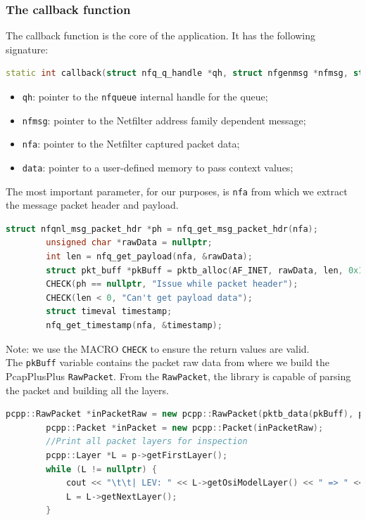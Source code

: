 \documentclass[12pt]{article}
\begin{document}
	\subsubsection{The callback function}

	The callback function is the core of the application. It has the following signature:
	\bigbreak
	
	\begin{lstlisting}[frame=single, language=C++]
		static int callback(struct nfq_q_handle *qh, struct nfgenmsg *nfmsg, struct nfq_data *nfa, void *data);
	\end{lstlisting}
	\bigbreak

	\begin{itemize}
		\item \lstinline{qh}: pointer to the \lstinline{nfqueue} internal handle for the queue;
		\item \lstinline{nfmsg}: pointer to the Netfilter address family dependent message;
		\item \lstinline{nfa}: pointer to the Netfilter captured packet data;
		\item \lstinline{data}: pointer to a user-defined memory to pass context values;
	\end{itemize}
	\bigbreak

	The most important parameter, for our purposes, is \lstinline{nfa} from which we extract the message packet header and payload.\\
	\bigbreak

	\begin{lstlisting}[frame=single, language=C++]
		struct nfqnl_msg_packet_hdr *ph = nfq_get_msg_packet_hdr(nfa);
		unsigned char *rawData = nullptr;
		int len = nfq_get_payload(nfa, &rawData);
		struct pkt_buff *pkBuff = pktb_alloc(AF_INET, rawData, len, 0x1000);
		CHECK(ph == nullptr, "Issue while packet header");
		CHECK(len < 0, "Can't get payload data");
		struct timeval timestamp;
		nfq_get_timestamp(nfa, &timestamp);
	\end{lstlisting}

	Note: we use the MACRO \lstinline{CHECK} to ensure the return values are valid.\\
	\bigbreak
	The \lstinline{pkBuff} variable contains the packet raw data from where we build the PcapPlusPlus \lstinline{RawPacket}. From the \lstinline{RawPacket}, the library is capable of parsing the packet and building all the layers.\\
	\bigbreak

	\begin{lstlisting}[frame=single, language=C++]
		pcpp::RawPacket *inPacketRaw = new pcpp::RawPacket(pktb_data(pkBuff), pktb_len(pkBuff), timestamp, false, pcpp::LINKTYPE_RAW);
		pcpp::Packet *inPacket = new pcpp::Packet(inPacketRaw);
		//Print all packet layers for inspection
		pcpp::Layer *L = p->getFirstLayer();
		while (L != nullptr) {
			cout << "\t\t| LEV: " << L->getOsiModelLayer() << " => " << L->toString() << endl;
			L = L->getNextLayer();
		}
	\end{lstlisting}
	\bigbreak
\end{document}
